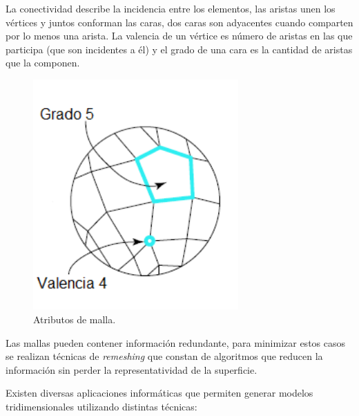 La conectividad describe la incidencia entre los elementos, las aristas unen los vértices y juntos conforman las caras, dos caras son adyacentes cuando comparten por lo menos una arista. La valencia de un vértice es número de aristas en las que participa (que son incidentes a él) y el grado de una cara es la cantidad de aristas que la componen.
\begin{figure}[H]
  \centering
    \includegraphics[width=0.7\textwidth]{./Cap2_videomapping/MallaAtributos}
  \caption{Atributos de malla.}
  \label{fig:MallaAtributos}
\end{figure}
Las mallas pueden contener información redundante, para minimizar estos casos se realizan técnicas de \emph{remeshing} que constan de algoritmos que reducen la información sin perder la representatividad de la superficie.

Existen diversas aplicaciones informáticas que permiten generar modelos tridimensionales utilizando distintas técnicas:

